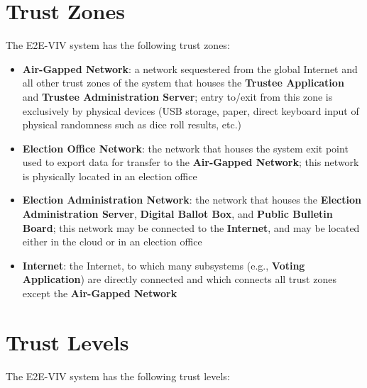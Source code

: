 \documentclass[10pt,letterpaper]{article}
\begin{document}
\section{Trust Zones}

The E2E-VIV system has the following trust zones:

\begin{itemize}

    \item \textbf{Air-Gapped Network}: a network sequestered from the global Internet and all other trust zones of the system that houses the \textbf{Trustee Application} and \textbf{Trustee Administration Server}; entry to/exit from this zone is exclusively by physical devices (USB storage, paper, direct keyboard input of physical randomness such as dice roll results, etc.)

    \item \textbf{Election Office Network}: the network that houses the system exit point used to export data for transfer to the \textbf{Air-Gapped Network}; this network is physically located in an election office

    \item \textbf{Election Administration Network}: the network that houses the \textbf{Election Administration Server}, \textbf{Digital Ballot Box}, and \textbf{Public Bulletin Board}; this network may be connected to the \textbf{Internet}, and may be located either in the cloud or in an election office

    \item \textbf{Internet}: the Internet, to which many subsystems (e.g., \textbf{Voting Application}) are directly connected and which connects all trust zones except the \textbf{Air-Gapped Network}

\end{itemize}

\section{Trust Levels}
The E2E-VIV system has the following trust levels:
\end{document}
